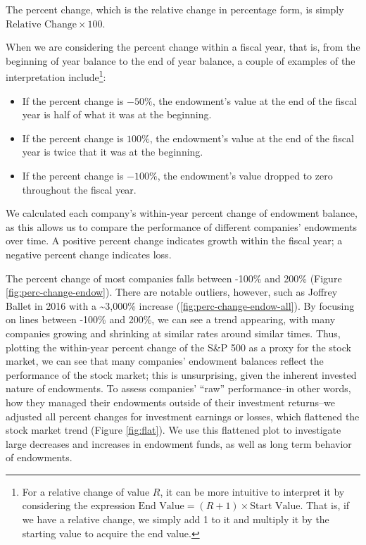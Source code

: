 \documentclass[Dance Data
Project,article,submit,moreauthors,pdftex]{mdpi}
\providecommand{\tightlist}{%
  \setlength{\itemsep}{0pt}\setlength{\parskip}{0pt}}
\begin{document}
The percent change, which is the relative change in percentage form, is
simply \(\text{Relative Change} \times 100\).

When we are considering the percent change within a fiscal year, that
is, from the beginning of year balance to the end of year balance, a
couple of examples of the interpretation include\footnote{For a relative
  change of value \(R\), it can be more intuitive to interpret it by
  considering the expression
  \(\text{End Value} = (R+1) \times \text{Start Value}.\) That is, if we
  have a relative change, we simply add 1 to it and multiply it by the
  starting value to acquire the end value.}:

\begin{itemize}
\tightlist
\item
  If the percent change is \(-50\%\), the endowment's value at the end
  of the fiscal year is half of what it was at the beginning.
\item
  If the percent change is \(100\%\), the endowment's value at the end
  of the fiscal year is twice that it was at the beginning.\\
\item
  If the percent change is \(-100\%\), the endowment's value dropped to
  zero throughout the fiscal year.
\end{itemize}

We calculated each company's within-year percent change of endowment
balance, as this allows us to compare the performance of different
companies' endowments over time. A positive percent change indicates
growth within the fiscal year; a negative percent change indicates loss.

The percent change of most companies falls between -100\% and 200\%
(Figure \ref{fig:perc-change-endow}). There are notable outliers,
however, such as Joffrey Ballet in 2016 with a \textasciitilde3,000\%
increase (\ref{fig:perc-change-endow-all}). By focusing on lines between
-100\% and 200\%, we can see a trend appearing, with many companies
growing and shrinking at similar rates around similar times. Thus,
plotting the within-year percent change of the S\&P 500 as a proxy for
the stock market, we can see that many companies' endowment balances
reflect the performance of the stock market; this is unsurprising, given
the inherent invested nature of endowments. To assess companies' ``raw''
performance--in other words, how they managed their endowments outside
of their investment returns--we adjusted all percent changes for
investment earnings or losses, which flattened the stock market trend
(Figure \ref{fig:flat}). We use this flattened plot to investigate large
decreases and increases in endowment funds, as well as long term
behavior of endowments.
\end{document}
